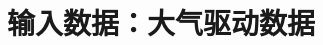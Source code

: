 \documentclass[a4paper,12pt,twoside]{article}
\begin{document}



\section{输入数据：大气驱动数据}
\end{document}
